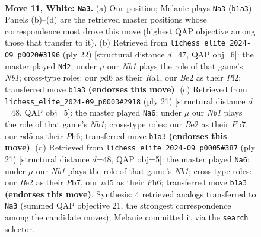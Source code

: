 \documentclass[11pt]{article}
\begin{document}
\clearpage

\begin{figure}[p]\centering
\begin{subfigure}{0.46\textwidth}\centering
\resizebox{\linewidth}{!}{%
\newchessgame
\chessboard[
  setfen={r1b1kb1r/p4ppp/2pp4/3n4/8/5P2/PPP1B1PP/RNB1K2R w KQkq - 0 11},
  showmover=false,
  pgfstyle=straightmove, color=movearrow, markmove={b1-a3}
]}
\caption{}
\end{subfigure}\hfill
\begin{subfigure}{0.46\textwidth}\centering
\resizebox{\linewidth}{!}{%
\newchessgame
\chessboard[
  setfen={r1b1kb1r/p1p2ppp/2p5/4P3/P1p5/8/1P3PPP/RNBR2K1 w kq - 0 12},
  showmover=false,
  pgfstyle=straightmove, color=movearrow, markmove={b1-d2}
]}
\caption{}
\end{subfigure}
\\[4pt]
\begin{subfigure}{0.46\textwidth}\centering
\resizebox{\linewidth}{!}{%
\newchessgame
\chessboard[
  setfen={rnb1k2r/pp3pp1/7p/2Pp4/8/2P2N2/P3PPPP/R3KB1R b KQkq - 0 11},
  showmover=false,
  pgfstyle=straightmove, color=movearrow, markmove={b8-a6}
]}
\caption{}
\end{subfigure}\hfill
\begin{subfigure}{0.46\textwidth}\centering
\resizebox{\linewidth}{!}{%
\newchessgame
\chessboard[
  setfen={rnb1k2r/pp3pp1/7p/2Pp4/8/2P2N2/P3PPPP/R3KB1R b KQkq - 0 11},
  showmover=false,
  pgfstyle=straightmove, color=movearrow, markmove={b8-a6}
]}
\caption{}
\end{subfigure}
\caption{\textbf{Move 11, White: \texttt{Na3}.} (a) Our position; Melanie plays \texttt{Na3} (\texttt{b1a3}). Panels (b)--(d) are the retrieved master positions whose correspondence most drove this move (highest QAP objective among those that transfer to it). (b) Retrieved from \texttt{lichess\_elite\_2024-09\_p0020\#3196} (ply 22) [structural distance $d$=47, QAP obj=6]: the master played \texttt{Nd2}; under $\mu$ our \emph{Nb1} plays the role of that game's \emph{Nb1}; cross-type roles: our \emph{p}d6 as their \emph{R}a1, our \emph{B}e2 as their \emph{P}f2; transferred move \texttt{b1a3} \textbf{(endorses this move)}. (c) Retrieved from \texttt{lichess\_elite\_2024-09\_p0003\#2918} (ply 21) [structural distance $d$=48, QAP obj=5]: the master played \texttt{Na6}; under $\mu$ our \emph{Nb1} plays the role of that game's \emph{Nb1}; cross-type roles: our \emph{B}e2 as their \emph{P}b7, our \emph{n}d5 as their \emph{P}h6; transferred move \texttt{b1a3} \textbf{(endorses this move)}. (d) Retrieved from \texttt{lichess\_elite\_2024-09\_p0005\#387} (ply 21) [structural distance $d$=48, QAP obj=5]: the master played \texttt{Na6}; under $\mu$ our \emph{Nb1} plays the role of that game's \emph{Nb1}; cross-type roles: our \emph{B}e2 as their \emph{P}b7, our \emph{n}d5 as their \emph{P}h6; transferred move \texttt{b1a3} \textbf{(endorses this move)}. Synthesis: 4 retrieved analogs transferred to \texttt{Na3} (summed QAP objective 21, the strongest correspondence among the candidate moves); Melanie committed it via the \texttt{search} selector.}
\label{fig:thought-m20}
\end{figure}
\end{document}
